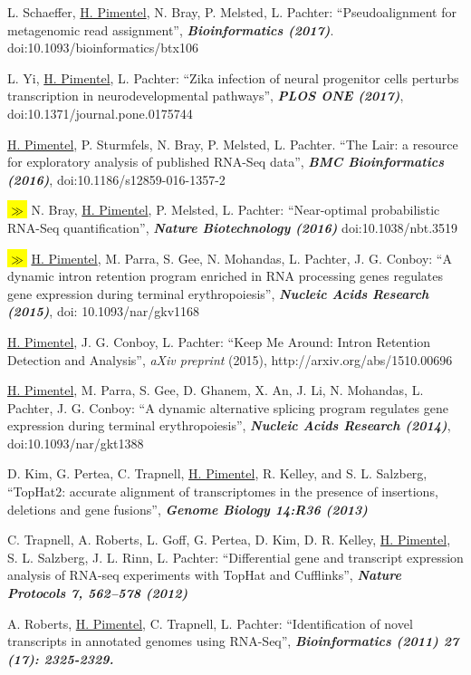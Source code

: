 \documentclass[overlapped]{res}
\newcommand{\hlc}[2][blue]{ {\sethlcolor{#1} \hl{#2}} }
\newcommand{\hlpub}{\hlc[Dandelion]{{\color{white}$\gg$} }}
\begin{document}
\begin{resume}
L. Schaeffer, \underline{H. Pimentel}, N. Bray, P. Melsted, L. Pachter: ``Pseudoalignment for metagenomic read assignment'', {\bf \emph{Bioinformatics (2017)}}. doi:10.1093/bioinformatics/btx106

L. Yi, \underline{H. Pimentel}, L. Pachter: ``Zika infection of neural progenitor cells perturbs transcription in neurodevelopmental pathways'', {\bf \emph{PLOS ONE (2017)}}, doi:10.1371/journal.pone.0175744

\newpage

\underline{H. Pimentel}, P. Sturmfels, N. Bray, P. Melsted, L. Pachter. ``The Lair: a resource for exploratory analysis of published RNA-Seq data'', {\bf \emph{BMC Bioinformatics (2016)}}, doi:10.1186/s12859-016-1357-2

\hlpub N. Bray, \underline{H. Pimentel}, P. Melsted, L. Pachter: ``Near-optimal probabilistic RNA-Seq quantification'', {\bf \emph{Nature Biotechnology (2016)}} doi:10.1038/nbt.3519

\hlpub\underline{H. Pimentel}, M. Parra, S. Gee, N. Mohandas, L. Pachter, J. G. Conboy: ``A dynamic intron retention program enriched in RNA processing genes regulates gene expression during terminal erythropoiesis'', {\bf \emph{Nucleic Acids Research (2015)}}, doi: 10.1093/nar/gkv1168

\underline{H. Pimentel}, J. G. Conboy, L. Pachter: ``Keep Me Around: Intron
Retention Detection and Analysis'', {\emph{aXiv preprint} (2015), http://arxiv.org/abs/1510.00696}

\underline{H. Pimentel}, M. Parra, S. Gee, D. Ghanem, X. An, J. Li, N.
Mohandas, L. Pachter, J. G. Conboy: ``A dynamic alternative splicing program
  regulates gene expression during terminal erythropoiesis'', {\bf \emph{Nucleic
    Acids Research (2014)}}, doi:10.1093/nar/gkt1388

D. Kim, G. Pertea, C. Trapnell, \underline{H. Pimentel}, R. Kelley, and S.
L. Salzberg, ``TopHat2: accurate alignment of transcriptomes in the presence of
insertions, deletions and gene fusions'', {\bf \emph{Genome Biology
    14:R36 (2013)}}

C. Trapnell, A. Roberts, L. Goff, G. Pertea, D. Kim, D. R. Kelley,
\underline{H. Pimentel}, S. L. Salzberg, J. L. Rinn, L. Pachter: ``Differential
gene and transcript expression analysis of RNA-seq experiments with TopHat and
Cufflinks'', {\bf \emph{Nature Protocols 7, 562–578 (2012)}}

A. Roberts, \underline{H. Pimentel}, C. Trapnell, L. Pachter: ``Identification
of novel transcripts in annotated genomes using RNA-Seq'', {\bf
  \emph{Bioinformatics (2011) 27 (17): 2325-2329.}}


\end{resume}
\end{document}

